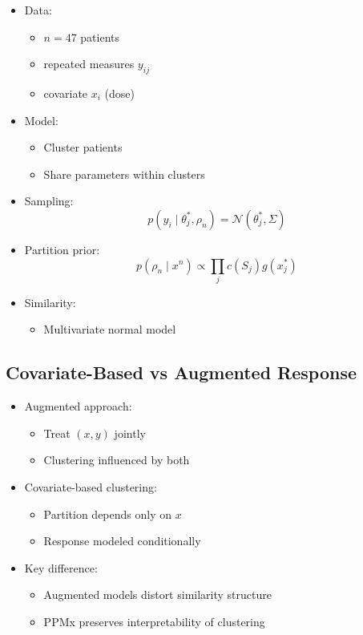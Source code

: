 \documentclass[12pt,oneside]{book}
\numberwithin{equation}{section}
\theoremstyle{definition}
\theoremstyle{plain}
\theoremstyle{remark}
\begin{document}
\begin{itemize}
\item Data:
\begin{itemize}
\item $n=47$ patients
\item repeated measures $y_{ij}$
\item covariate $x_i$ (dose)
\end{itemize}

\item Model:
\begin{itemize}
\item Cluster patients
\item Share parameters within clusters
\end{itemize}

\item Sampling:
\[
p(y_i \mid \theta_j^*, \rho_n) = \mathcal{N}(\theta_j^*, \Sigma)
\]

\item Partition prior:
\[
p(\rho_n \mid x^n) \propto \prod_j c(S_j) g(x_j^*)
\]

\item Similarity:
\begin{itemize}
\item Multivariate normal model
\end{itemize}
\end{itemize}

\subsection*{Covariate-Based vs Augmented Response}

\begin{itemize}
\item Augmented approach:
\begin{itemize}
\item Treat $(x,y)$ jointly
\item Clustering influenced by both
\end{itemize}

\item Covariate-based clustering:
\begin{itemize}
\item Partition depends only on $x$
\item Response modeled conditionally
\end{itemize}

\item Key difference:
\begin{itemize}
\item Augmented models distort similarity structure
\item PPMx preserves interpretability of clustering
\end{itemize}
\end{itemize}
\end{document}
